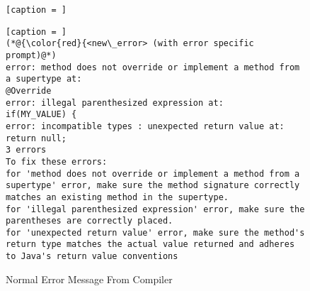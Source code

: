 \begin{figure}[t]
\begin{minipage}{0.45\textwidth}
\begin{lstlisting}[caption = ]
\end{lstlisting}
\end{minipage}
\begin{minipage}{0.45\textwidth}        
\begin{lstlisting}[caption = ]
(*@{\color{red}{<new\_error> (with error specific prompt)@*)
error: method does not override or implement a method from a supertype at:
@Override
error: illegal parenthesized expression at:
if(MY_VALUE) {
error: incompatible types : unexpected return value at:
return null;
3 errors
To fix these errors:
for 'method does not override or implement a method from a supertype' error, make sure the method signature correctly matches an existing method in the supertype.
for 'illegal parenthesized expression' error, make sure the parentheses are correctly placed.
for 'unexpected return value' error, make sure the method's return type matches the actual value returned and adheres to Java's return value conventions
\end{lstlisting}
\end{minipage}
\vspace{-12pt}
\caption{Normal Error Message From Compiler{\tool}}
\label{fig:err-speciic-prompt}
\end{figure}
